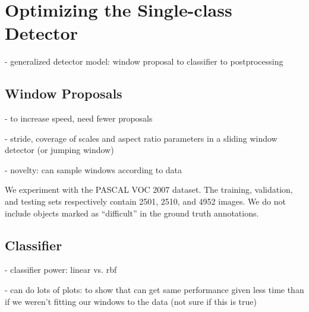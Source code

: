 \section{Optimizing the Single-class Detector}
- generalized detector model: window proposal to classifier to postprocessing

\subsection{Window Proposals}
- to increase speed, need fewer proposals

- stride, coverage of scales and aspect ratio parameters in a sliding window detector (or jumping window)

- novelty: can sample windows according to data

We experiment with the PASCAL VOC 2007 dataset.
The training, validation, and testing sets respectively contain 2501, 2510, and 4952 images.
We do not include objects marked as ``difficult'' in the ground truth annotations.


\subsection{Classifier}
- classifier power: linear vs. rbf

- can do lots of plots: to show that can get same performance given less time than if we weren’t fitting our windows to the data (not sure if this is true)
